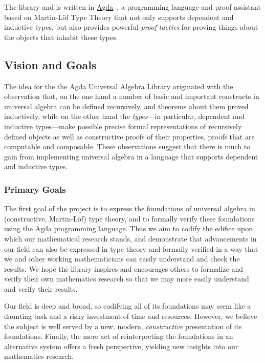 \documentclass[sigplan,screen]{acmart}
\newcommand{\agda}{\href{https://wiki.portal.chalmers.se/agda/pmwiki.php}{Agda}\xspace}
\begin{document}
The library and is written in \agda~\cite{Norell:2009}, a programming language and proof assistant based on Martin-L\"of Type Theory that not only supports dependent and inductive types, but also provides powerful \emph{proof tactics} for proving things about the objects that inhabit these types.

\subsection{Vision and Goals}\label{vision-and-goals}
The idea for the the Agda Universal Algebra Library originated with the observation that, on the one hand a number of basic and important constructs in universal algebra can be defined recursively, and theorems about them proved inductively, while on the other hand the \emph{types}---in particular, dependent and inductive types---make possible precise formal representations of recursively defined objects as well as constructive proofs of their properties, proofs that are computable and composable. These observations suggest that there is much to gain from implementing universal algebra in a language that supports dependent and inductive types.

\subsubsection{Primary Goals}\label{primary-goals}
The first goal of the project is to express the foundations of universal algebra in (constructive, Martin-L\"of) type theory, and to formally verify these foundations using the Agda programming language. Thus we aim to codify the edifice upon which our mathematical research stands, and demonstrate that advancements in our field can also be expressed in type theory and formally verified in a way that we and other working mathematicians can easily understand and check the results. We hope the library inspires and encourages others to formalize and verify their own mathematics research so that we may more easily understand and verify their results.

Our field is deep and broad, so codifying all of its foundations may seem like a daunting task and a risky investment of time and resources. However, we believe the subject is well served by a new, modern, \emph{constructive} presentation of its foundations.  Finally, the mere act of reinterpreting the foundations in an alternative system offers a fresh perspective, yielding new insights into our mathematics research.
\end{document}
